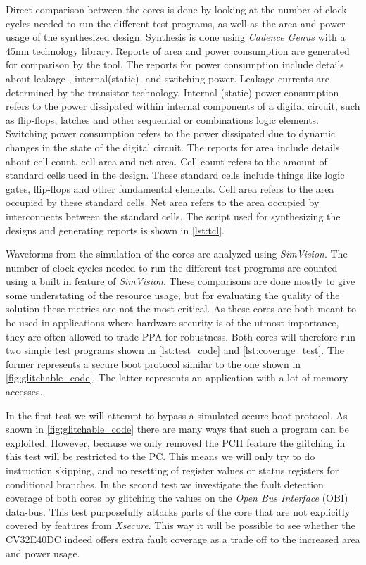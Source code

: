 Direct comparison between the cores is done by looking at the number of clock cycles needed to run the different test programs, as well as the area and power usage of the synthesized design. Synthesis is done using \textit{Cadence Genus} with a 45nm technology library. Reports of area and power consumption are generated for comparison by the tool. The reports for power consumption include details about leakage-, internal(static)- and switching-power. Leakage currents are determined by the transistor technology. Internal (static) power consumption refers to the power dissipated within internal components of a digital circuit, such as flip-flops, latches and other sequential or combinations logic elements. Switching power consumption refers to the power dissipated due to dynamic changes in the state of the digital circuit. The reports for area include details about cell count, cell area and net area. Cell count refers to the amount of standard cells used in the design. These standard cells include things like logic gates, flip-flops and other fundamental elements. Cell area refers to the area occupied by these standard cells. Net area refers to the area occupied by interconnects between the standard cells. The script used for synthesizing the designs and generating reports is shown in \autoref{lst:tcl}. 

Waveforms from the simulation of the cores are analyzed using \textit{SimVision}. The number of clock cycles needed to run the different test programs are counted using a built in feature of \textit{SimVision}. These comparisons are done mostly to give some understating of the resource usage, but for evaluating the quality of the solution these metrics are not the most critical. As these cores are both meant to be used in applications where hardware security is of the utmost importance, they are often allowed to trade PPA for robustness. Both cores will therefore run two simple test programs shown in \autoref{lst:test_code} and \autoref{lst:coverage_test}. The former represents a secure boot protocol similar to the one shown in \autoref{fig:glitchable_code}. The latter represents an application with a lot of memory accesses. 

In the first test we will attempt to bypass a simulated secure boot protocol. As shown in \autoref{fig:glitchable_code} there are many ways that such a program can be exploited. However, because we only removed the PCH feature the glitching in this test will be restricted to the PC. This means we will only try to do instruction skipping, and no resetting of register values or status registers for conditional branches. In the second test we investigate the fault detection coverage of both cores by glitching the values on the \textit{Open Bus Interface} (OBI) data-bus. This test purposefully attacks parts of the core that are not explicitly covered by features from \textit{Xsecure}. This way it will be possible to see whether the CV32E40DC indeed offers extra fault coverage as a trade off to the increased area and power usage. 

